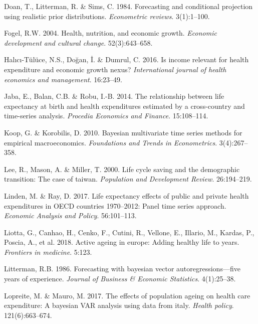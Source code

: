 \documentclass[11pt,preprint, authoryear]{elsarticle}
\numberwithin{equation}{section}
\numberwithin{figure}{section}
\numberwithin{table}{section}
\newlength{\cslhangindent}
\newenvironment{CSLReferences}%
  {\setlength{\parindent}{0pt}%
  \everypar{\setlength{\hangindent}{\cslhangindent}}\ignorespaces}%
  {\par}
\begin{document}
\begin{CSLReferences}{1}{0}
\leavevmode{}%
Doan, T., Litterman, R. \& Sims, C. 1984. Forecasting and conditional
projection using realistic prior distributions. \emph{Econometric
reviews}. 3(1):1--100.

\leavevmode{}%
Fogel, R.W. 2004. Health, nutrition, and economic growth. \emph{Economic
development and cultural change}. 52(3):643--658.

\leavevmode{}%
Halıcı-Tülüce, N.S., Doğan, İ. \& Dumrul, C. 2016. Is income relevant
for health expenditure and economic growth nexus? \emph{International
journal of health economics and management}. 16:23--49.

\leavevmode{}%
Jaba, E., Balan, C.B. \& Robu, I.-B. 2014. The relationship between life
expectancy at birth and health expenditures estimated by a cross-country
and time-series analysis. \emph{Procedia Economics and Finance}.
15:108--114.

\leavevmode{}%
Koop, G. \& Korobilis, D. 2010. Bayesian multivariate time series
methods for empirical macroeconomics. \emph{Foundations and
Trends{\textregistered} in Econometrics}. 3(4):267--358.

\leavevmode{}%
Lee, R., Mason, A. \& Miller, T. 2000. Life cycle saving and the
demographic transition: The case of taiwan. \emph{Population and
Development Review}. 26:194--219.

\leavevmode{}%
Linden, M. \& Ray, D. 2017. Life expectancy effects of public and
private health expenditures in OECD countries 1970--2012: Panel time
series approach. \emph{Economic Analysis and Policy}. 56:101--113.

\leavevmode{}%
Liotta, G., Canhao, H., Cenko, F., Cutini, R., Vellone, E., Illario, M.,
Kardas, P., Poscia, A., et al. 2018. Active ageing in europe: Adding
healthy life to years. \emph{Frontiers in medicine}. 5:123.

\leavevmode{}%
Litterman, R.B. 1986. Forecasting with bayesian vector
autoregressions---five years of experience. \emph{Journal of Business \&
Economic Statistics}. 4(1):25--38.

\leavevmode{}%
Lopreite, M. \& Mauro, M. 2017. The effects of population ageing on
health care expenditure: A bayesian VAR analysis using data from italy.
\emph{Health policy}. 121(6):663--674.


\end{CSLReferences}
\end{document}
